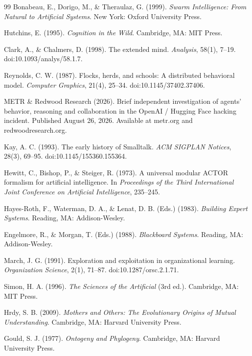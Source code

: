 \documentclass[11pt]{article}
\begin{document}
\begin{thebibliography}{99}
 Bonabeau, E., Dorigo, M., \& Theraulaz, G. (1999). \emph{Swarm Intelligence: From Natural to Artificial Systems}. New York: Oxford University Press.

 Hutchins, E. (1995). \emph{Cognition in the Wild}. Cambridge, MA: MIT Press.

 Clark, A., \& Chalmers, D. (1998). The extended mind. \emph{Analysis}, 58(1), 7--19. doi:10.1093/analys/58.1.7.

 Reynolds, C. W. (1987). Flocks, herds, and schools: A distributed behavioral model. \emph{Computer Graphics}, 21(4), 25--34. doi:10.1145/37402.37406.

 METR \& Redwood Research (2026). Brief independent investigation of agents' behavior, reasoning and collaboration in the OpenAI / Hugging Face hacking incident. Published August 26, 2026. Available at metr.org and redwoodresearch.org.


 Kay, A. C. (1993). The early history of Smalltalk. \emph{ACM SIGPLAN Notices}, 28(3), 69--95. doi:10.1145/155360.155364.

 Hewitt, C., Bishop, P., \& Steiger, R. (1973). A universal modular ACTOR formalism for artificial intelligence. In \emph{Proceedings of the Third International Joint Conference on Artificial Intelligence}, 235--245.

 Hayes-Roth, F., Waterman, D. A., \& Lenat, D. B. (Eds.) (1983). \emph{Building Expert Systems}. Reading, MA: Addison-Wesley.

 Engelmore, R., \& Morgan, T. (Eds.) (1988). \emph{Blackboard Systems}. Reading, MA: Addison-Wesley.


 March, J. G. (1991). Exploration and exploitation in organizational learning. \emph{Organization Science}, 2(1), 71--87. doi:10.1287/orsc.2.1.71.

 Simon, H. A. (1996). \emph{The Sciences of the Artificial} (3rd ed.). Cambridge, MA: MIT Press.

 Hrdy, S. B. (2009). \emph{Mothers and Others: The Evolutionary Origins of Mutual Understanding}. Cambridge, MA: Harvard University Press.

 Gould, S. J. (1977). \emph{Ontogeny and Phylogeny}. Cambridge, MA: Harvard University Press.

\end{thebibliography}
\end{document}
